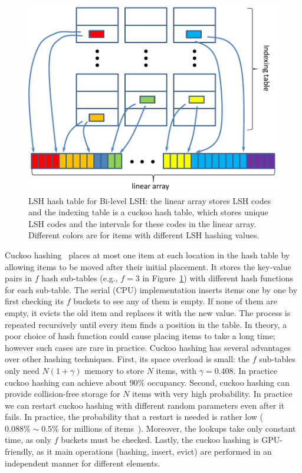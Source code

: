 \begin{figure}[htb]
  \centering
  \includegraphics[width=0.8\linewidth]{figs/6/hashtable.pdf}
  \caption[LSH hash table for Bi-level LSH]{\label{fig:6:hashtable} LSH hash table for Bi-level LSH: the linear array stores LSH codes and the indexing table is a cuckoo hash table, which stores unique LSH codes and the intervals for these codes in the linear array. Different colors are for items with different LSH hashing values.}
\end{figure}

Cuckoo hashing~\cite{Pagh:2004:CH} places at most one item at each location in the hash table by allowing items to be moved after their initial placement. It stores the key-value pairs in $f$ hash sub-tables (e.g., $f = 3$ in Figure~\ref{fig:6:hashtable}) with different hash functions for each sub-table. The serial (CPU) implementation inserts items one by one by first checking its $f$ buckets to see any of them is empty. If none of them are empty, it evicts the old item and replaces it with the new value. The process is repeated recursively until every item finds a position in the table. In theory, a poor choice of hash function could cause placing items to take a long time; however such cases are rare in practice.
Cuckoo hashing has several advantages over other hashing techniques. First, its space overload is small: the $f$ sub-tables only need $N(1+\gamma)$ memory to store $N$ items, with $\gamma = 0.408$. In practice cuckoo hashing can achieve about $90\%$ occupancy. Second, cuckoo hashing can provide collision-free storage for $N$ items with very high probability. In practice we can restart cuckoo hashing with different random parameters even after it fails. In practice, the probability that a restart is needed is rather low ($0.088\%\sim0.5\%$ for millions of items~\cite{Alcantara:2009:RPH}). Moreover, the lookups take only constant time, as only $f$ buckets must be checked. Lastly, the cuckoo hashing is GPU-friendly, as it main operations (hashing, insert, evict) are performed in an independent manner for different elements.

